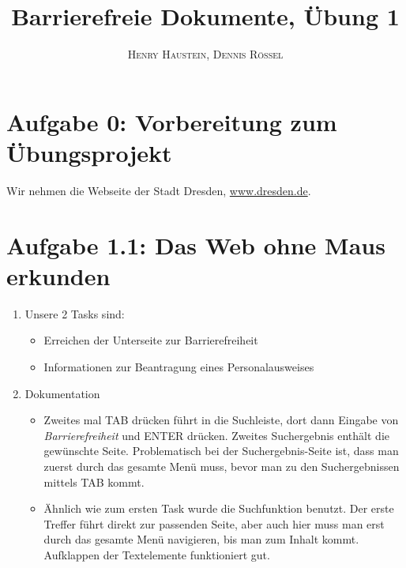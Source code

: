 \documentclass{article}
\title{\textbf{Barrierefreie Dokumente, Übung 1}}
\author{\textsc{Henry Haustein}, \textsc{Dennis Rössel}}
\date{}
\begin{document}
	\maketitle
	
	\section*{Aufgabe 0: Vorbereitung zum Übungsprojekt}
	Wir nehmen die Webseite der Stadt Dresden, \url{www.dresden.de}.
	
	\section*{Aufgabe 1.1: Das Web ohne Maus erkunden}
	\begin{enumerate}[label=(\alph*)]
		\item Unsere 2 Tasks sind:
		\begin{itemize}
			\item Erreichen der Unterseite zur Barrierefreiheit
			\item Informationen zur Beantragung eines Personalausweises
		\end{itemize}
		\item Dokumentation
		\begin{itemize}
			\item Zweites mal TAB drücken führt in die Suchleiste, dort dann Eingabe von \textit{Barrierefreiheit} und ENTER drücken. Zweites Suchergebnis enthält die gewünschte Seite. Problematisch bei der Suchergebnis-Seite ist, dass man zuerst durch das gesamte Menü muss, bevor man zu den Suchergebnissen mittels TAB kommt.
			\item Ähnlich wie zum ersten Task wurde die Suchfunktion benutzt. Der erste Treffer führt direkt zur passenden Seite, aber auch hier muss man erst durch das gesamte Menü navigieren, bis man zum Inhalt kommt. Aufklappen der Textelemente funktioniert gut.
		\end{itemize}
	\end{enumerate}
\end{document}
